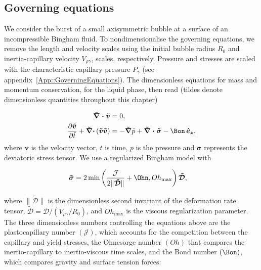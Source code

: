 \subsection{Governing equations}\label{Sec::DimensionlessForm}

We consider the burst of a small axisymmetric bubble at a surface of an incompressible Bingham fluid. To nondimensionalise the governing equations, we remove the length and velocity scales using the initial bubble radius $R_0$ and inertia-capillary velocity $V_{\rho\gamma}$, scales, respectively. Pressure and stresses are scaled with the characteristic capillary pressure $P_{\gamma}$ (see appendix~\ref{App::GoverningEquations}). The dimensionless equations for mass and momentum conservation, for the liquid phase, then read (tildes denote dimensionless quantities throughout this chapter)

\begin{align}
	\boldsymbol{\tilde{\nabla}\cdot\tilde{v}} &=0,\label{Eqn::FinalFormLiqContinuity}\\
	\frac{\partial\boldsymbol{\tilde{v}}}{\partial \tilde{t}} + \boldsymbol{\tilde{\nabla}\cdot}\left(\boldsymbol{\tilde{v}\tilde{v}}\right) &= -\boldsymbol{\tilde{\nabla}} \tilde{p} + \boldsymbol{\tilde{\nabla}\cdot\tilde{\sigma}} - \Bon\,\boldsymbol{\hat{e}}_{\boldsymbol{z}}\label{Eqn::FinalFormLiqNS},
\end{align}
%
where $\boldsymbol{v}$ is the velocity vector, $t$ is time, $p$ is the pressure and $\boldsymbol{\sigma}$ represents the deviatoric stress tensor. We use a regularized Bingham model with

\begin{align}
	\boldsymbol{\tilde{\sigma}} &= 2\,\text{min}\left(\frac{\mathcal{J}}{2\|\boldsymbol{\tilde{\mathcal{D}}}\|} + \Ohn, Oh_\text{max}\right)\boldsymbol{\tilde{\mathcal{D}}},\label{Eqn::RegularizedForm}
\end{align}
%

where $\|\boldsymbol{\tilde{\mathcal{D}}}\|$ is the dimensionless second invariant of the deformation rate tensor, $\boldsymbol{\tilde{\mathcal{D}}} = 
\boldsymbol{\mathcal{D}}/(V_{\rho\gamma}/R_0)$, and $Oh_{\text{max}}$ is the viscous regularization parameter. The three dimensionless numbers controlling the equations above are the plastocapillary number $\left(\mathcal{J}\right)$, which accounts for the competition between the capillary and yield stresses, the Ohnesorge number $\left(Oh\right)$ that compares the inertio-capillary to inertio-viscous time scales, and the Bond number $\left(\Bon\right)$, which compares gravity and surface tension forces:

